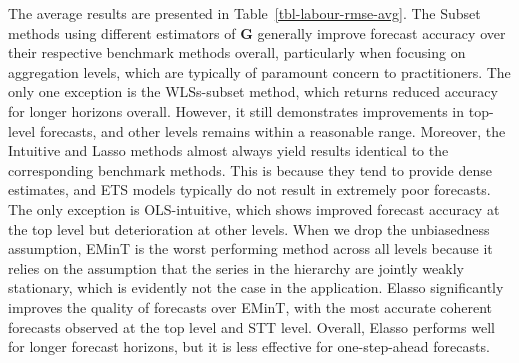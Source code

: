 \documentclass[11pt,a4paper,]{article}
\begin{document}
The average results are presented in Table~\ref{tbl-labour-rmse-avg}.
The Subset methods using different estimators of \(\boldsymbol{G}\)
generally improve forecast accuracy over their respective benchmark
methods overall, particularly when focusing on aggregation levels, which
are typically of paramount concern to practitioners. The only one
exception is the WLSs-subset method, which returns reduced accuracy for
longer horizons overall. However, it still demonstrates improvements in
top-level forecasts, and other levels remains within a reasonable range.
Moreover, the Intuitive and Lasso methods almost always yield results
identical to the corresponding benchmark methods. This is because they
tend to provide dense estimates, and ETS models typically do not result
in extremely poor forecasts. The only exception is OLS-intuitive, which
shows improved forecast accuracy at the top level but deterioration at
other levels. When we drop the unbiasedness assumption, EMinT is the
worst performing method across all levels because it relies on the
assumption that the series in the hierarchy are jointly weakly
stationary, which is evidently not the case in the application. Elasso
significantly improves the quality of forecasts over EMinT, with the
most accurate coherent forecasts observed at the top level and STT
level. Overall, Elasso performs well for longer forecast horizons, but
it is less effective for one-step-ahead forecasts.
\end{document}
